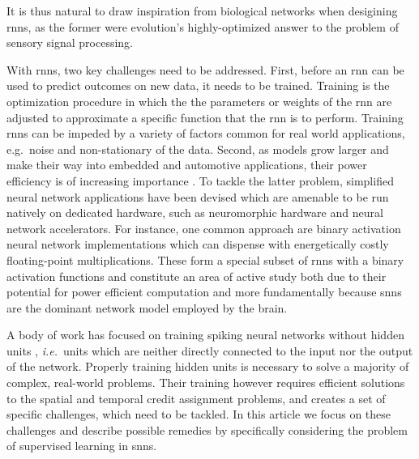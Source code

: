 \documentclass[journal,onecolumn,11pt]{IEEEtran}
\begin{document}
It is thus natural to draw inspiration from biological networks when desigining \glspl{rnn}, as the former were evolution's highly-optimized answer to the problem of sensory signal processing. 

With \glspl{rnn}, two key challenges need to be addressed. 
First, before an \gls{rnn} can be used to predict outcomes on new data, it needs to be trained.
Training is the optimization procedure in which the the parameters or weights of the \gls{rnn} are adjusted to approximate a specific function that the \gls{rnn} is to perform.
Training \glspl{rnn} can be impeded by a variety of factors common for real world applications, e.g.\ noise and non-stationary of the data. 
Second, as models grow larger and make their way into embedded and automotive applications, their power efficiency is of increasing importance \cite{boahen_neuromorphs_2017}. 
To tackle the latter problem, simplified neural network applications have been devised which are amenable to be run natively on dedicated hardware, such as neuromorphic hardware and neural network accelerators.  
For instance, one common approach are binary activation neural network implementations which can dispense with energetically costly floating-point multiplications. %
These form a special subset of \glspl{rnn} with a binary activation functions and constitute an area of active study both due to their potential for power
efficient computation and more fundamentally because \glspl{snn} are the dominant network model employed by the brain.

A body of work has focused on training spiking neural networks without hidden units \cite{ponulak_supervised_2009, Gutig_Sompolinsky06_tempneur,
florian_chronotron:_2012, mohemmed_span:_2012, memmesheimer_learning_2014, Anwani_Rajendran15_normappr}, \emph{i.e.}\ units which are neither directly connected to the input nor the output of the network.  
Properly training hidden units is necessary to solve a majority of complex, real-world problems.
Their training however requires efficient solutions to the spatial and temporal credit assignment problems, and creates a set of specific challenges, which need to be tackled.  
In this article we focus on these challenges and describe possible remedies by specifically considering the problem of supervised learning in \glspl{snn}.
\end{document}
